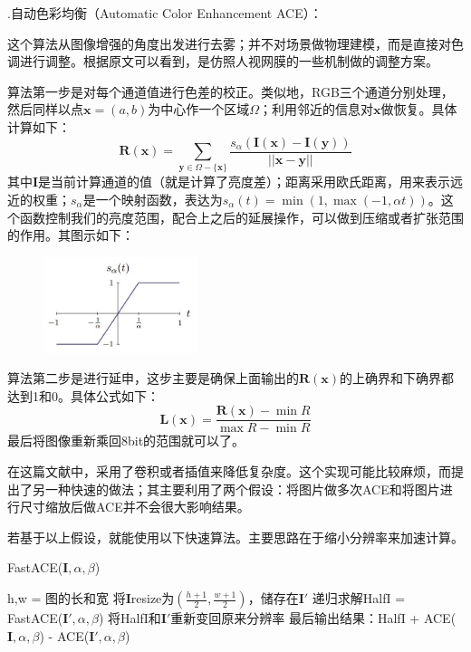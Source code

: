\documentclass[12pt]{article}
\begin{document}
\begin{large}
    .自动色彩均衡（Automatic Color Enhancement ACE）：\par
\end{large}
这个算法从图像增强的角度出发进行去雾；并不对场景做物理建模，而是直接对色调进行调整。根据原文可以看到，是仿照人视网膜的一些机制做的调整方案。\par
算法第一步是对每个通道值进行色差的校正。类似地，RGB三个通道分别处理，然后同样以点$\bm{x}=(a,b)$为中心作一个区域$\Omega$；利用邻近的信息对$\bm{x}$做恢复。具体计算如下：\begin{equation}\label{eqn-1} 
  \bm{R}(\bm{x})=\sum_{\bm{y}\in \Omega-\{\bm{x}\}}\frac{s_{\alpha}(\bm{I}(\bm{x})-\bm{I}(\bm{y}))}{\left\vert|\bm{x}-\bm{y}|\right\vert}
\end{equation}
其中$\bm{I}$是当前计算通道的值（就是计算了亮度差）；距离采用欧氏距离，用来表示远近的权重；$s_{\alpha}$是一个映射函数，表达为$s_{\alpha}(t)=\min(1,\max(-1,\alpha t))$。这个函数控制我们的亮度范围，配合上之后的延展操作，可以做到压缩或者扩张范围的作用。其图示如下：
\begin{figure}[h]
    \centering
    \includegraphics[width=0.4\textwidth]{dip1.jpg}
\end{figure}
\par
算法第二步是进行延申，这步主要是确保上面输出的$\bm{R}(\bm{x})$的上确界和下确界都达到1和0。具体公式如下：\begin{equation}\label{eqn-1} 
  \bm{L}(\bm{x})=\frac{\bm{R}(\bm{x})-\min R}{\max R-\min R}
\end{equation}
最后将图像重新乘回8bit的范围就可以了。\par
在这篇文献中，采用了卷积或者插值来降低复杂度。这个实现可能比较麻烦，而\cite{张方略2013自动色彩均衡算法的速度优化}提出了另一种快速的做法；其主要利用了两个假设：将图片做多次ACE和将图片进行尺寸缩放后做ACE并不会很大影响结果。\par
若基于以上假设，就能使用以下快速算法。主要思路在于缩小分辨率来加速计算。
\begin{algorithm}[htb]
\caption{FastACE($\bm{I},\alpha,\beta$)}
\LinesNumbered
{}
h,w = 图的长和宽\;
将$\bm{I}$\;resize为$\displaystyle(\frac{h + 1}{2},\frac{w + 1}{2})$，储存在$\bm{I'}$\;
递归求解HalfI = FastACE($\bm{I'},\alpha,\beta$)\;
将HalfI和$\bm{I'}$重新变回原来分辨率\;
最后输出结果：HalfI + ACE($\bm{I},\alpha,\beta$) - ACE($\bm{I'},\alpha,\beta$)\;
\end{algorithm}\\
\end{document}
